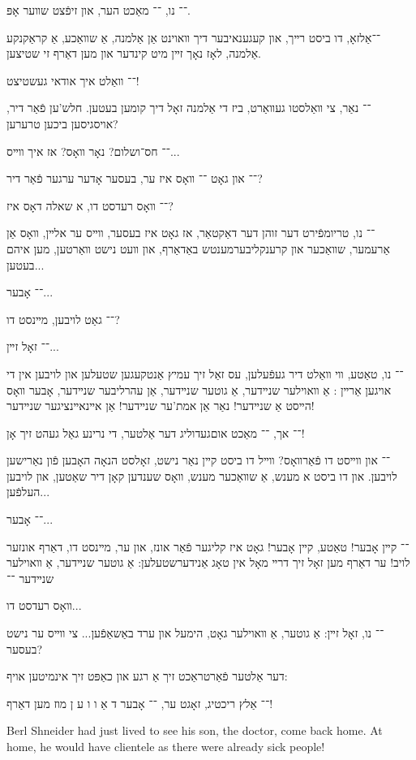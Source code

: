 \documentclass{article}
\begin{document}
\begin{pairs}
\begin{Rightside}
\begin{RTL}
\begin{hebrew}
־־ נו, ־־  מאַכט הער, און זיפֿצט שװער אָפּ.

־־אַלזאָ, דו ביסט רײך, און קעגענאיבער דיך װאוינט אַן אַלמנה, אַ שװאַכע, אַ קראַקנקע אַלמנה,
לאָז נאָך זײן מיט קינדער און מען דאַרף זי שטיצען.

־־ װאַלט איך אודאי געשטיצט!
 
 ־־ נאַר, צי װאַלסטו געװאַרט, ביז די אַלמנה זאָל דיך קומען בעטען.
  חלש'ען פֿאַר דיר,  אויסגיסען ביכען טרערען?

־־ חס־ושלום? נאָר װאָס? אז איך װײס... 

־־ און גאָט ־־ װאָס איז ער, בעסער אָדער ערגער פֿאַר דיר?

־־ װאָס רעדסט דו, א שאלה דאָס איז?

־־ נו, טריומפֿירט דער זוהן דער דאַקטאַר, אז גאָט איז בעסער,
װײס ער אלײן, װאָס אַן אַרעמער, שװאַכער און
קרענקליבערמענטש באַדאַרף, און װעט נישט װאַרטען, מען איהם בעטען...

־־ אָבער...

־־ גאַט לויבען, מײנסט דו?

־־ זאָל זײן...

־־ נו, טאַטע, װי װאַלט דיר געפֿעלען, עס זאַל זיך עמיץ
אַנטקעגען שטעלען און לויבען אין די אויגען אַרײן : אַ װאוילער
שנײדער, אַ גוטער שנײדער, אַן עהרליבער שנײדער, אָבער װאָס
הײסט אַ שנײדער! נאַר אַן אמת'ער שנײדער! אַן אײנאײנציגער
שנײדער!

־־ אך, ־־ מאַכט אוםגעדוליג דער אַלטער, די נרינע גאַל געהט זיך אָן!

־־ און װײסט דו פֿאַרװאָס? װײל דו ביסט קײן נאַר נישט,
זאָלסט הנאָה האָבען פֿון נאַרישען לויבען. און דו ביסט א מענש,
אַ שװאַכער מענש, װאָס שענדען קאָן דיר שאַטען, און לויבען
העלפֿען...

־־ אָבער...

־־ קײן אָבער! טאַטע, קײן אָבער! גאָט איז קליגער פֿאַר
אונז, און ער, מײנסט דו, דאַרף אונזער לויב! ער דאַרף מען זאָל
זיך דרײ מאָל אין טאָג אַנידערשטעלען: אַ גוטער שנײדער, אַ
װאוילער שנײדער ־־

װאָס רעדסט דו... 

־־ נו, זאָל זײן: אַ גוטער, אַ װאוילער גאָט, הימעל
און ערד באַשאַפֿען... צי װײס ער נישט בעסער?

דער אַלטער פֿאַרטראַכט זיך אַ רגע און כאַפּט זיך אינמיטען
אויף:

־־ אַלץ ריכטיג, זאָגט ער, ־־ אָבער ד אַ ו ו ע ן מוז מען דאַרף!  

\endnumbering
\end{hebrew}
\end{RTL}
\end{Rightside}
\begin{Leftside}
\begin{english}
\beginnumbering
\autopar
Berl Shneider had just lived to see his son, the doctor, come back home.
At home, he would have clientele as there were already sick people!


\end{english}
\end{Leftside}
\end{pairs}
\end{document}
